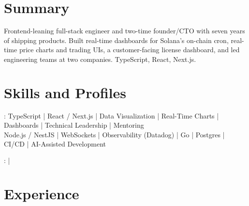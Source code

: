 \documentclass[print]{jack-resume}
\begin{document}
\pagecolor{darkmodeBackground}


\begin{minipage}[t][1cm][t]{.03\textwidth}
    \hfill
\end{minipage}

\section{Summary}
Frontend-leaning full-stack engineer and two-time founder/CTO with seven years of shipping products. Built real-time dashboards for Solana's on-chain cron, real-time price charts and trading UIs, a customer-facing license dashboard, and led engineering teams at two companies. TypeScript, React, Next.js.
\sectionsep

\section{Skills and Profiles}
:
TypeScript \hfill | \hfill
React / Next.js \hfill | \hfill
Data Visualization \hfill | \hfill
Real-Time Charts \hfill | \hfill
Dashboards \hfill | \hfill
Technical Leadership \hfill | \hfill
Mentoring \\
\hspace{1.0cm} Node.js / NestJS \hfill | \hfill
WebSockets \hfill | \hfill
Observability (Datadog) \hfill | \hfill
Go \hfill | \hfill
Postgres \hfill | \hfill
CI/CD \hfill | \hfill
AI-Assisted Development \\

\raggedright{
    :
      \href{https://www.linkedin.com/in/jack-sturtevant/}{ \ExternalLink} |
     \href{https://github.com/jacksturt}{ \ExternalLink}}

\section{Experience}
\end{document}
